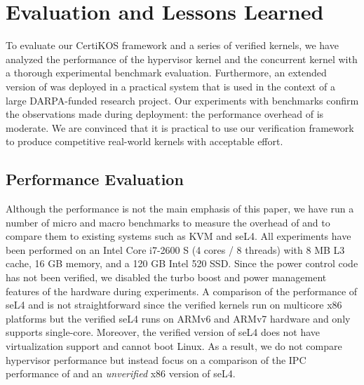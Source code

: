 
\chapter{Evaluation and Lessons Learned}
\label{chap-eval}
To evaluate
our CertiKOS framework
and a series of verified kernels,
we have analyzed the performance of the \mCTOShyper{} hypervisor kernel and the  \cCTOS{} concurrent kernel
with a thorough experimental benchmark evaluation.
Furthermore, an extended version of \mCTOShyper{}
was deployed in a practical system that is used in the context of a
large DARPA-funded research project. Our experiments with benchmarks
confirm the observations made during deployment: the performance
overhead of \mCTOShyper{} is moderate. We are convinced that it is
practical to use our verification framework to produce competitive
real-world kernels with acceptable effort.


\section{Performance Evaluation} 
Although the performance is not the main emphasis of this paper, we
have run a number of micro and macro benchmarks to measure the
overhead of {\mCTOS} and {\cCTOS}
to compare them to existing systems such
as KVM and seL4. All experiments have been performed on an Intel Core
i7-2600 S (4 cores / 8 threads) with 8 MB L3 cache, 16 GB memory, and
a 120 GB Intel 520 SSD. Since the power control code has not been
verified, we disabled the turbo boost and power management features of
the hardware during experiments.
A comparison of the performance of seL4 and \cCTOS{} is not
straightforward since the verified \cCTOS{} kernels run on 
multicore
x86
platforms but the verified seL4 runs on ARMv6
and ARMv7 hardware and only supports single-core. Moreover, the
verified version of seL4 does not have virtualization support and
cannot boot Linux. As a result, we do not compare hypervisor
performance but instead focus on a comparison of the IPC performance
of {\cCTOS} and an \emph{unverified} x86 version of seL4.


